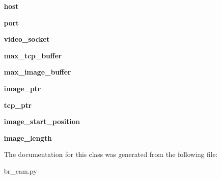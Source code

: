 \begin{DoxyCompactItemize}
\item 
\hypertarget{classbr__cam_1_1RovCam_a444c1a5a4573419abcca6187786c19ca}{{\bfseries host}}\label{classbr__cam_1_1RovCam_a444c1a5a4573419abcca6187786c19ca}

\item 
\hypertarget{classbr__cam_1_1RovCam_a44586070e98805f1d0b64ad38744ebc4}{{\bfseries port}}\label{classbr__cam_1_1RovCam_a44586070e98805f1d0b64ad38744ebc4}

\item 
\hypertarget{classbr__cam_1_1RovCam_af09fe6d8965cc49f05dca7981d7201ff}{{\bfseries video\-\_\-socket}}\label{classbr__cam_1_1RovCam_af09fe6d8965cc49f05dca7981d7201ff}

\item 
\hypertarget{classbr__cam_1_1RovCam_a8855b9429faa4ed74d2ed8762abd512d}{{\bfseries max\-\_\-tcp\-\_\-buffer}}\label{classbr__cam_1_1RovCam_a8855b9429faa4ed74d2ed8762abd512d}

\item 
\hypertarget{classbr__cam_1_1RovCam_a7f451631f9b524d7c1d2fe1486aa8ab8}{{\bfseries max\-\_\-image\-\_\-buffer}}\label{classbr__cam_1_1RovCam_a7f451631f9b524d7c1d2fe1486aa8ab8}

\item 
\hypertarget{classbr__cam_1_1RovCam_a85590d3550111625bc586c10b04ef206}{{\bfseries image\-\_\-ptr}}\label{classbr__cam_1_1RovCam_a85590d3550111625bc586c10b04ef206}

\item 
\hypertarget{classbr__cam_1_1RovCam_ad3f03bf588e85c0ddb249ef183ae0d95}{{\bfseries tcp\-\_\-ptr}}\label{classbr__cam_1_1RovCam_ad3f03bf588e85c0ddb249ef183ae0d95}

\item 
\hypertarget{classbr__cam_1_1RovCam_a3f858da05cda076aec26ee07b4576010}{{\bfseries image\-\_\-start\-\_\-position}}\label{classbr__cam_1_1RovCam_a3f858da05cda076aec26ee07b4576010}

\item 
\hypertarget{classbr__cam_1_1RovCam_a9dae792c94c7dfbd9c6b1b49d1da3196}{{\bfseries image\-\_\-length}}\label{classbr__cam_1_1RovCam_a9dae792c94c7dfbd9c6b1b49d1da3196}

\end{DoxyCompactItemize}


The documentation for this class was generated from the following file\-:\begin{DoxyCompactItemize}
\item 
br\-\_\-cam.\-py\end{DoxyCompactItemize}
